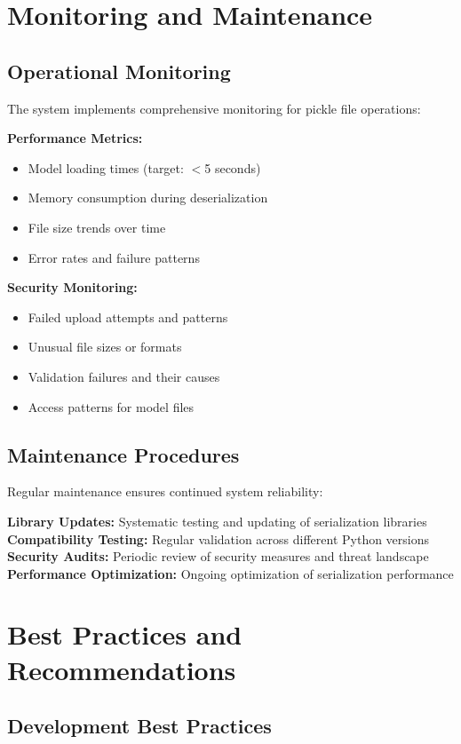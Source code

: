 \section{Monitoring and Maintenance}

\subsection{Operational Monitoring}

The system implements comprehensive monitoring for pickle file operations:

\textbf{Performance Metrics:}
\begin{itemize}
\item Model loading times (target: $<$5 seconds)
\item Memory consumption during deserialization
\item File size trends over time
\item Error rates and failure patterns
\end{itemize}

\textbf{Security Monitoring:}
\begin{itemize}
\item Failed upload attempts and patterns
\item Unusual file sizes or formats
\item Validation failures and their causes
\item Access patterns for model files
\end{itemize}

\subsection{Maintenance Procedures}

Regular maintenance ensures continued system reliability:

\textbf{Library Updates:} Systematic testing and updating of serialization libraries
\textbf{Compatibility Testing:} Regular validation across different Python versions
\textbf{Security Audits:} Periodic review of security measures and threat landscape
\textbf{Performance Optimization:} Ongoing optimization of serialization performance

\section{Best Practices and Recommendations}

\subsection{Development Best Practices}

